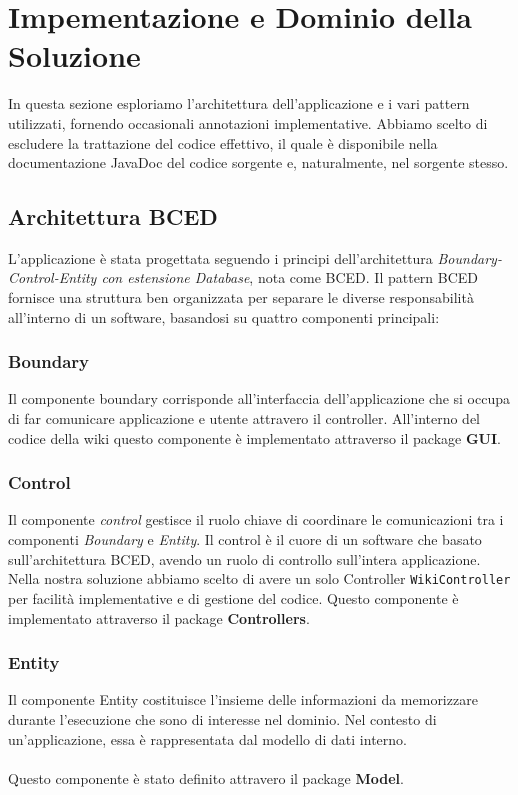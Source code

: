 \documentclass{article}
\begin{document}
		\newpage
		
		\section{Impementazione e Dominio della Soluzione}
		
		In questa sezione esploriamo l'architettura dell'applicazione e i vari pattern utilizzati, fornendo occasionali annotazioni implementative. Abbiamo scelto di escludere la trattazione del codice effettivo, il quale è disponibile nella documentazione JavaDoc del codice sorgente e, naturalmente, nel sorgente stesso.
		
		\subsection{Architettura BCED}
		
		L'applicazione è stata progettata seguendo i principi dell'architettura {\itshape {Boundary-Control-Entity con estensione Database}}, nota come BCED. Il pattern BCED fornisce una struttura ben organizzata per separare le diverse responsabilità all'interno di un software, basandosi su quattro componenti principali:
		
		
		\subsubsection{Boundary}
		Il componente boundary corrisponde all'interfaccia dell'applicazione che si occupa di far comunicare applicazione e utente attravero il controller. All'interno del codice della wiki questo componente \`e implementato attraverso il package \textbf{GUI}.

		\subsubsection{Control} Il componente \textit{control} gestisce il ruolo chiave di coordinare le comunicazioni tra  i componenti \textit{Boundary} e \textit{Entity}. Il control è il cuore di un software che basato sull'architettura BCED, avendo un ruolo di controllo sull'intera applicazione. Nella nostra soluzione abbiamo scelto di avere un solo Controller \texttt{WikiController} per facilità implementative e di gestione del codice. Questo componente \`e implementato attraverso il package \textbf{Controllers}. 
		
		\subsubsection{Entity}
		Il componente Entity costituisce l'insieme delle informazioni da memorizzare durante l'esecuzione che sono di interesse nel dominio. Nel contesto di un'applicazione, essa è rappresentata dal modello di dati interno. \\\\
		Questo componente \`e stato definito attravero il package \textbf{Model}. 
		
\end{document}
